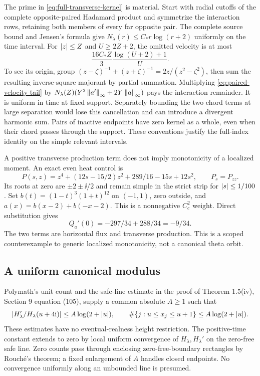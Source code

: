 The prime in \eqref{eq:full-transverse-kernel} is material. Start with
radial cutoffs of the complete opposite-paired Hadamard product and
symmetrize the interaction rows, retaining both members of every far
opposite pair. The complete source bound and Jensen's formula give
\(N_\lambda(r)\le C_*r\log(r+2)\) uniformly on the time interval.
For \(\left|z\right|\le Z\) and \(U\ge2Z+2\), the omitted velocity is at most
\begin{equation}\label{eq:paired-velocity-tail}
 \frac{16C_*Z}{3}\frac{\log(U+2)+1}{U}.
\end{equation}
To see its origin, group
\((z-\zeta)^{-1}+(z+\zeta)^{-1}=2z/(z^2-\zeta^2)\),
then sum the resulting inverse-square majorant by partial summation.
Multiplying \eqref{eq:paired-velocity-tail} by
\(N_\lambda(Z)(Y^2\left\lVert a'\right\rVert_\infty+2Y\left\lVert a\right\rVert_\infty)\)
pays the interaction remainder. It is uniform in time at fixed support.
Separately bounding the two chord terms at large separation would lose
this cancellation and can introduce a divergent harmonic sum. Pairs of
inactive endpoints have zero kernel as a whole, even when their chord
passes through the support. These conventions justify the full-index
identity on the simple relevant intervals.

A positive transverse production term does not imply monotonicity of a
localized moment. An exact even heat control is
\[
 P(s,z)=z^4+(12s-15/2)z^2+289/16-15s+12s^2,
 \qquad P_s=P_{zz}.
\]
Its roots at zero are \(\pm2\pm\ii/2\) and remain simple in the strict
strip for \(\left|s\right|\le1/100\). Set
\(b(t)=(1-t)^3(1+t)^{12}\) on \((-1,1)\), zero outside, and
\(a(x)=b(x-2)+b(-x-2)\). This is a nonnegative \(C_c^2\) weight.
Direct substitution gives
\[
 Q_a'(0)=-297/34+288/34=-9/34.
\]
The two terms are horizontal flux and transverse production. This is a
scoped counterexample to generic localized monotonicity, not a canonical
theta orbit.

\subsection{A uniform canonical modulus}
Polymath's unit count and the safe-line estimate in the proof of
Theorem 1.5(iv), Section 9 equation (105), supply a common absolute
\(A\ge1\) such that
\begin{equation}\label{eq:coarse-canonical}
 \left|H_\lambda'/H_\lambda(u+4\mathrm i)\right|\le A\log(2+\left|u\right|),\qquad
 \#\{j:u\le x_j\le u+1\}\le A\log(2+\left|u\right|).
\end{equation}
These estimates have no eventual-realness height restriction. The
positive-time constant extends to zero by local uniform convergence of
\(H_\lambda,H_\lambda'\) on the zero-free safe line. Zero counts pass
through enclosing zero-free-boundary rectangles by Rouch\'e's theorem;
a fixed enlargement of \(A\) handles closed endpoints. No convergence
uniformly along an unbounded line is presumed.


